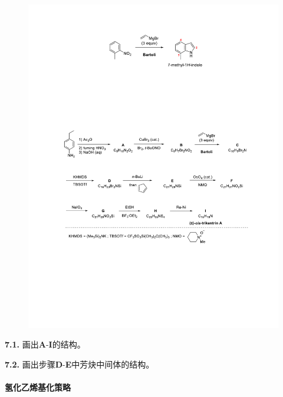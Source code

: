 \begin{figure}[h]
	\centering
	\includegraphics[width=16cm]{./pic/t7-3.pdf}
\end{figure}

\noindent\textbf{7.1.} 画出\textbf{A}-\textbf{I}的结构。

\noindent\textbf{7.2.} 画出步骤\textbf{D}-\textbf{E}中芳炔中间体的结构。

\paragraph{氢化乙烯基化策略}

